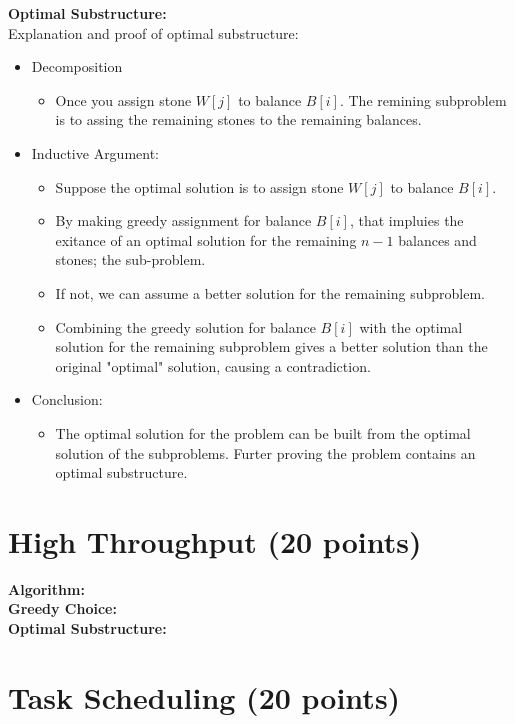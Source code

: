 \documentclass{article}[12pt]
\begin{document}
\noindent\textbf{Optimal Substructure:} \\
Explanation and proof of optimal substructure: \\
\begin{itemize}
  \item Decomposition
    \begin{itemize}
      \item Once you assign stone $W[j]$ to balance $B[i]$.
        The remining subproblem is to assing the remaining stones to the remaining balances.
    \end{itemize}
  \item Inductive Argument:
    \begin{itemize}
      \item Suppose the optimal solution is to assign stone $W[j]$ to balance $B[i]$.
      \item By making greedy assignment for balance $B[i]$, that impluies
        the exitance of an optimal solution for the remaining $n-1$ balances and stones; the sub-problem.
      \item If not, we can assume a better solution for the remaining subproblem.
      \item Combining the greedy solution for balance $B[i]$ with the optimal solution for the remaining subproblem
        gives a better solution than the original "optimal" solution, causing a contradiction.
    \end{itemize}
  \item Conclusion:
    \begin{itemize}
      \item The optimal solution for the problem can be built from the optimal solution of the subproblems.
        Furter proving the problem contains an optimal substructure.
    \end{itemize}
\end{itemize}

\newpage
\section{High Throughput (20 points)}
\noindent\textbf{Algorithm:} \\
\noindent\textbf{Greedy Choice:} \\
\noindent\textbf{Optimal Substructure:} \\

\newpage
\section{Task Scheduling (20 points)}
\end{document}
